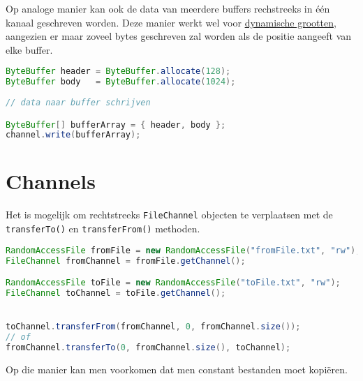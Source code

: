 \documentclass{report}
\begin{document}
Op analoge manier kan ook de data van meerdere buffers rechstreeks in één kanaal geschreven worden. Deze manier werkt wel voor \underline{dynamische grootten}, aangezien er maar zoveel bytes geschreven zal worden als de positie aangeeft van elke buffer.
\begin{lstlisting}[language=java]
ByteBuffer header = ByteBuffer.allocate(128);
ByteBuffer body   = ByteBuffer.allocate(1024);
	
// data naar buffer schrijven

ByteBuffer[] bufferArray = { header, body };
channel.write(bufferArray);
\end{lstlisting}

\section{Channels}
Het is mogelijk om rechtstreeks \texttt{FileChannel} objecten te verplaatsen met de \texttt{transferTo()} en \texttt{transferFrom()} methoden.
\begin{lstlisting}[language=java]
RandomAccessFile fromFile = new RandomAccessFile("fromFile.txt", "rw");
FileChannel fromChannel = fromFile.getChannel();

RandomAccessFile toFile = new RandomAccessFile("toFile.txt", "rw");
FileChannel toChannel = toFile.getChannel();


toChannel.transferFrom(fromChannel, 0, fromChannel.size());
// of
fromChannel.transferTo(0, fromChannel.size(), toChannel);
\end{lstlisting}

Op die manier kan men voorkomen dat men constant bestanden moet kopiëren.
\end{document}
